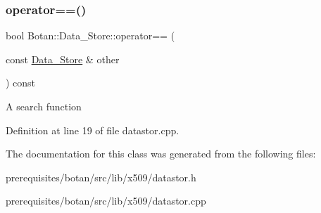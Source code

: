 \subsubsection{\texorpdfstring{operator==()}{operator==()}}
{\footnotesize\ttfamily bool Botan\+::\+Data\+\_\+\+Store\+::operator== (\begin{DoxyParamCaption}\item[{const \mbox{\hyperlink{class_botan_1_1_data___store}{Data\+\_\+\+Store}} \&}]{other }\end{DoxyParamCaption}) const}

A search function 

Definition at line 19 of file datastor.\+cpp.



The documentation for this class was generated from the following files\+:\begin{DoxyCompactItemize}
\item 
prerequisites/botan/src/lib/x509/datastor.\+h\item 
prerequisites/botan/src/lib/x509/datastor.\+cpp\end{DoxyCompactItemize}
